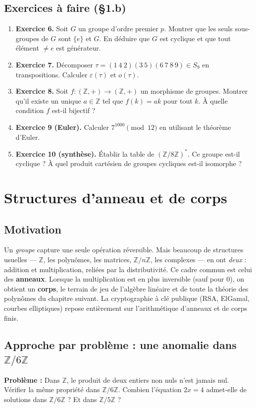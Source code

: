 \documentclass[12pt,a4paper]{report}
\theoremstyle{definition}
\theoremstyle{remark}
\begin{document}
\subsection{Exercices à faire (§1.b)}
\begin{enumerate}
    \item \textbf{Exercice 6.} Soit $G$ un groupe d'ordre premier $p$. Montrer que les seuls sous-groupes de $G$ sont $\{e\}$ et $G$. En déduire que $G$ est cyclique et que tout élément $\neq e$ est générateur.
    \item \textbf{Exercice 7.} Décomposer $\tau = (1\ 4\ 2)(3\ 5)(6\ 7\ 8\ 9) \in S_9$ en transpositions. Calculer $\varepsilon(\tau)$ et $o(\tau)$.
    \item \textbf{Exercice 8.} Soit $f : (\mathbb{Z}, +) \to (\mathbb{Z}, +)$ un morphisme de groupes. Montrer qu'il existe un unique $a \in \mathbb{Z}$ tel que $f(k) = ak$ pour tout $k$. À quelle condition $f$ est-il bijectif ?
    \item \textbf{Exercice 9 (Euler).} Calculer $7^{1000} \pmod{12}$ en utilisant le théorème d'Euler.
    \item \textbf{Exercice 10 (synthèse).} Établir la table de $(\mathbb{Z}/8\mathbb{Z})^*$. Ce groupe est-il cyclique ? À quel produit cartésien de groupes cycliques est-il isomorphe ?
\end{enumerate}

\section{Structures d'anneau et de corps}

\subsection{Motivation}
Un \emph{groupe} capture une seule opération réversible. Mais beaucoup de structures usuelles --- $\mathbb{Z}$, les polynômes, les matrices, $\mathbb{Z}/n\mathbb{Z}$, les complexes --- en ont \emph{deux} : addition et multiplication, reliées par la distributivité. Ce cadre commun est celui des \textbf{anneaux}. Lorsque la multiplication est en plus inversible (sauf pour $0$), on obtient un \textbf{corps}, le terrain de jeu de l'algèbre linéaire et de toute la théorie des polynômes du chapitre suivant. La cryptographie à clé publique (RSA, ElGamal, courbes elliptiques) repose entièrement sur l'arithmétique d'anneaux et de corps finis.

\subsection{Approche par problème : une anomalie dans $\mathbb{Z}/6\mathbb{Z}$}
\textbf{Problème :} Dans $\mathbb{Z}$, le produit de deux entiers non nuls n'est jamais nul. Vérifier la même propriété dans $\mathbb{Z}/6\mathbb{Z}$. Combien l'équation $2x = 4$ admet-elle de solutions dans $\mathbb{Z}/6\mathbb{Z}$ ? Et dans $\mathbb{Z}/5\mathbb{Z}$ ?
\end{document}
